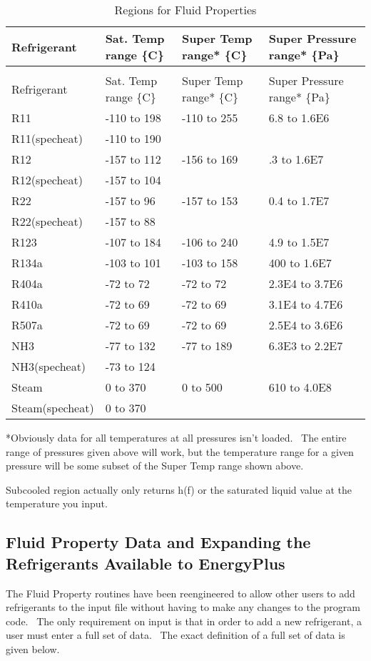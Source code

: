\begin{longtable}[c]{p{1.5in}p{1.5in}p{1.5in}p{1.5in}}
\caption{Regions for Fluid Properties \label{table:regions-for-fluid-properties}} \tabularnewline
\toprule 
Refrigerant & Sat. Temp range \{C\} & Super Temp range* \{C\} & Super Pressure range* \{Pa\} \tabularnewline
\midrule
\endfirsthead

\caption[]{Regions for Fluid Properties} \tabularnewline
\toprule 
Refrigerant & Sat. Temp range \{C\} & Super Temp range* \{C\} & Super Pressure range* \{Pa\} \tabularnewline
\midrule
\endhead

R11 & -110 to 198 & -110 to 255 & 6.8 to 1.6E6 \tabularnewline
R11(specheat) & -110 to 190 & ~ & ~ \tabularnewline
R12 & -157 to 112 & -156 to 169 & .3 to 1.6E7 \tabularnewline
R12(specheat) & -157 to 104 & ~ & ~ \tabularnewline
R22 & -157 to 96 & -157 to 153 & 0.4 to 1.7E7 \tabularnewline
R22(specheat) & -157 to 88 & ~ & ~ \tabularnewline
R123 & -107 to 184 & -106 to 240 & 4.9 to 1.5E7 \tabularnewline
R134a & -103 to 101 & -103 to 158 & 400 to 1.6E7 \tabularnewline
R404a & -72 to 72 & -72 to 72 & 2.3E4 to 3.7E6 \tabularnewline
R410a & -72 to 69 & -72 to 69 & 3.1E4 to 4.7E6 \tabularnewline
R507a & -72 to 69 & -72 to 69 & 2.5E4 to 3.6E6 \tabularnewline
NH3 & -77 to 132 & -77 to 189 & 6.3E3 to 2.2E7 \tabularnewline
NH3(specheat) & -73 to 124 & ~ & ~ \tabularnewline
Steam & 0 to 370 & 0 to 500 & 610 to 4.0E8 \tabularnewline
Steam(specheat) & 0 to 370 & ~ & ~ \tabularnewline
\bottomrule
\end{longtable}

*Obviously data for all temperatures at all pressures isn't loaded.~ The entire range of pressures given above will work, but the temperature range for a given pressure will be some subset of the Super Temp range shown above.

Subcooled region actually only returns h(f) or the saturated liquid value at the temperature you input.

\subsection{Fluid Property Data and Expanding the Refrigerants Available to EnergyPlus}\label{fluid-property-data-and-expanding-the-refrigerants-available-to-energyplus}

The Fluid Property routines have been reengineered to allow other users to add refrigerants to the input file without having to make any changes to the program code.~ The only requirement on input is that in order to add a new refrigerant, a user must enter a full set of data.~ The exact definition of a full set of data is given below.

